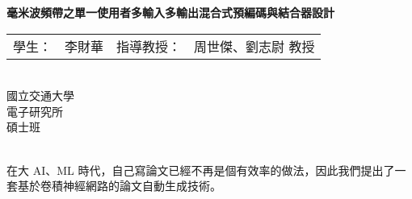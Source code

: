 \newpage
\thispagestyle{plain}
\begin{center}
	\TSzTwenty\selectfont
		\textbf{毫米波頻帶之單一使用者多輸入多輸出混合式預編碼與結合器設計} \\[0.5cm]
	\TSzFourteen\selectfont
		\begin{tabular}{r l r l}
			學生： & 李財華& \hspace{4cm} 指導教授： & 周世傑、劉志尉 教授 \\
		\end{tabular}
    \\[0.5cm]
	\TSzFourteen\selectfont
	國立交通大學 \\[0.5cm] 
	電子研究所 \\[0.5cm] 
	碩士班 \\[0.5cm]
	 \\[0.5cm]
\end{center}

\TSzTwelveThirty\selectfont
在大 AI、ML 時代，自己寫論文已經不再是個有效率的做法，因此我們提出了一套基於卷積神經網路的論文自動生成技術。

